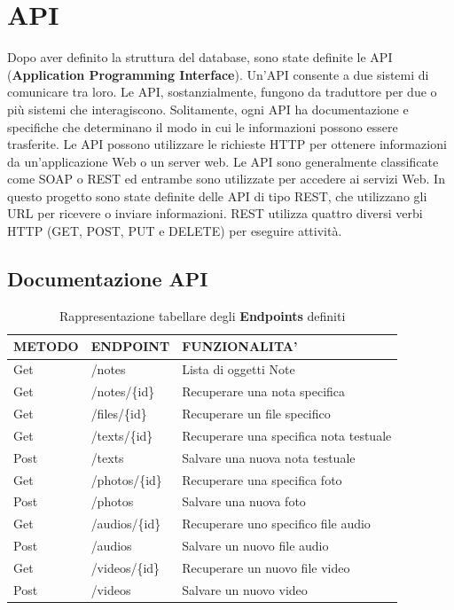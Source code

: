 \section{API}

Dopo aver definito la struttura del database, sono state definite le API (\textbf{Application Programming Interface}). Un'API consente a due sistemi di comunicare tra loro. Le API, sostanzialmente, fungono da traduttore per due o più sistemi che interagiscono. Solitamente, ogni API ha documentazione e specifiche che determinano il modo in cui le informazioni possono essere trasferite.
Le API possono utilizzare le richieste HTTP per ottenere informazioni da un'applicazione Web o un server web. Le API sono generalmente classificate come SOAP o REST ed entrambe sono utilizzate per accedere ai servizi Web. In questo progetto sono state definite delle API di tipo REST, che utilizzano gli URL per ricevere o inviare informazioni. REST utilizza quattro diversi verbi HTTP (GET, POST, PUT e DELETE) per eseguire attività.

\subsection{Documentazione API}


\begin{table}[!h]
\centering
	\begin{tabular}{@{}lll@{}}
		\toprule
		METODO & ENDPOINT          & FUNZIONALITA’                   \\ \midrule
		Get    & /notes            & Lista di oggetti Note           \\
		Get    & /notes/\{id\}     & Recuperare una nota specifica    \\
		Get    & /files/\{id\}     & Recuperare un file specifico     \\
		Get    & /texts/\{id\}     & Recuperare una specifica nota testuale  \\
		Post   & /texts            & Salvare una nuova nota testuale \\
		Get    & /photos/\{id\}    & Recuperare una specifica foto   \\
		Post   & /photos           & Salvare una nuova foto          \\
		Get    & /audios/\{id\}    & Recuperare uno specifico file audio \\
		Post   & /audios           & Salvare un nuovo file audio               \\
		Get    & /videos/\{id\}    & Recuperare un nuovo file video      \\
		Post   & /videos           & Salvare un nuovo video               \\ \bottomrule
	\end{tabular}
\caption{Rappresentazione tabellare degli \textbf{Endpoints} definiti}\label{etichetta}
\end{table}

